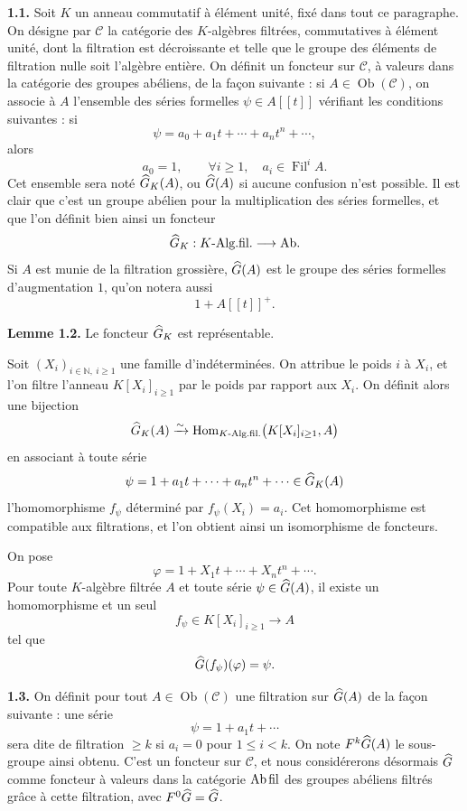 \documentclass[11pt]{article}
\newcommand{\Fil}{\operatorname{Fil}}
\begin{document}
\textbf{1.1.} Soit \(K\) un anneau commutatif à élément unité, fixé dans tout ce paragraphe. On désigne par \(\mathcal C\) la catégorie des \(K\)-algèbres filtrées, commutatives à élément unité, dont la filtration est décroissante et telle que le groupe des éléments de filtration nulle soit l'algèbre entière. On définit un foncteur sur \(\mathcal C\), à valeurs dans la catégorie des groupes abéliens, de la façon suivante : si \(A\in\operatorname{Ob}(\mathcal C)\), on associe à \(A\) l'ensemble des séries formelles \(\psi\in A[[t]]\) vérifiant les conditions suivantes : si
\[
  \psi=a_0+a_1t+\cdots+a_nt^n+\cdots,
\]
alors
\begin{equation}\tag{1.1.1}
  a_0=1,\qquad \forall i\geq 1,\quad a_i\in\Fil^i A .
\end{equation}
Cet ensemble sera noté \(\widehat G_K(A)\), ou \(\widehat G(A)\) si aucune confusion n'est possible. Il est clair que c'est un groupe abélien pour la multiplication des séries formelles, et que l'on définit bien ainsi un foncteur
\[
  \widehat G_K:K\text{-Alg.fil.}\longrightarrow \mathrm{Ab}.
\]
Si \(A\) est munie de la filtration grossière, \(\widehat G(A)\) est le groupe des séries formelles d'augmentation \(1\), qu'on notera aussi
\[
  1+A[[t]]^+.
\]

\textbf{Lemme 1.2.} Le foncteur \(\widehat G_K\) est représentable.

Soit \((X_i)_{i\in\mathbb N,\ i\geq 1}\) une famille d'indéterminées. On attribue le poids \(i\) à \(X_i\), et l'on filtre l'anneau \(K[X_i]_{i\geq 1}\) par le poids par rapport aux \(X_i\). On définit alors une bijection
\[
  \widehat G_K(A)\xrightarrow{\sim}
  \operatorname{Hom}_{K\text{-Alg.fil.}}\bigl(K[X_i]_{i\geq 1},A\bigr)
\]
en associant à toute série
\[
  \psi=1+a_1t+\cdots+a_nt^n+\cdots\in\widehat G_K(A)
\]
l'homomorphisme \(f_\psi\) déterminé par \(f_\psi(X_i)=a_i\). Cet homomorphisme est compatible aux filtrations, et l'on obtient ainsi un isomorphisme de foncteurs.

On pose
\[
  \varphi=1+X_1t+\cdots+X_nt^n+\cdots.
\]
Pour toute \(K\)-algèbre filtrée \(A\) et toute série \(\psi\in\widehat G(A)\), il existe un homomorphisme et un seul
\[
  f_\psi\in K[X_i]_{i\geq 1}\longrightarrow A
\]
tel que
\[
  \widehat G(f_\psi)(\varphi)=\psi .
\]

\textbf{1.3.} On définit pour tout \(A\in\operatorname{Ob}(\mathcal C)\) une filtration sur \(\widehat G(A)\) de la façon suivante : une série
\[
  \psi=1+a_1t+\cdots
\]
sera dite de filtration \(\geq k\) si \(a_i=0\) pour \(1\leq i<k\). On note \(F^k\widehat G(A)\) le sous-groupe ainsi obtenu. C'est un foncteur sur \(\mathcal C\), et nous considérerons désormais \(\widehat G\) comme foncteur à valeurs dans la catégorie \(\mathrm{Ab\,fil}\) des groupes abéliens filtrés grâce à cette filtration, avec \(F^0\widehat G=\widehat G\).
\end{document}
